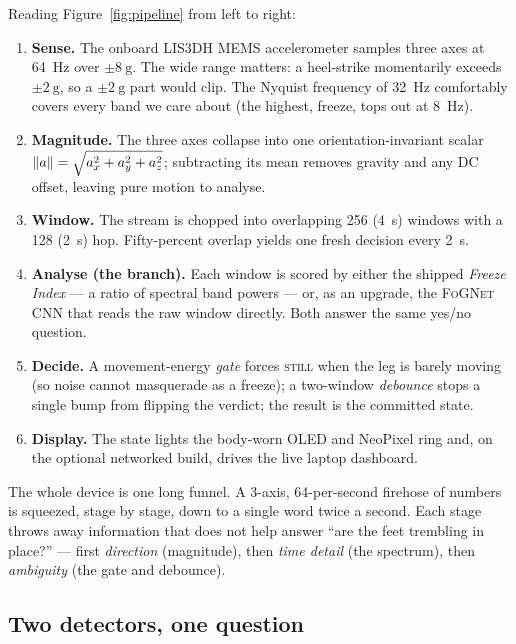 Reading Figure~\ref{fig:pipeline} from left to right:

\begin{enumerate}
  \item \textbf{Sense.} The onboard LIS3DH MEMS accelerometer samples three axes at
    \SI{64}{\hertz} over $\pm\SI{8}{\gram}$. The wide range matters: a heel-strike
    momentarily exceeds $\pm\SI{2}{\gram}$, so a $\pm\SI{2}{\gram}$ part would clip.
    The Nyquist frequency of \SI{32}{\hertz} comfortably covers every band we care about
    (the highest, freeze, tops out at \SI{8}{\hertz}).
  \item \textbf{Magnitude.} The three axes collapse into one orientation-invariant
    scalar $\lVert a \rVert=\sqrt{a_x^2+a_y^2+a_z^2}$; subtracting its mean removes gravity and
    any DC offset, leaving pure motion to analyse.
  \item \textbf{Window.} The stream is chopped into overlapping
    \SI{256}{} (\SI{4}{\second}) windows with a \SI{128}{}
    (\SI{2}{\second}) hop. Fifty-percent overlap yields one fresh decision every
    \SI{2}{\second}.
  \item \textbf{Analyse (the branch).} Each window is scored by either the shipped
    \emph{Freeze Index} --- a ratio of spectral band powers --- or, as an upgrade, the
    \textsc{FoGNet} CNN that reads the raw window directly. Both answer the same yes/no
    question.
  \item \textbf{Decide.} A movement-energy \emph{gate} forces \textsc{still} when the leg
    is barely moving (so noise cannot masquerade as a freeze); a two-window
    \emph{debounce} stops a single bump from flipping the verdict; the result is the
    committed state.
  \item \textbf{Display.} The state lights the body-worn OLED and NeoPixel ring and, on
    the optional networked build, drives the live laptop dashboard.
\end{enumerate}

\begin{intuition}
The whole device is one long funnel. A 3-axis, 64-per-second firehose of numbers is
squeezed, stage by stage, down to a single word twice a second. Each stage throws away
information that does not help answer ``are the feet trembling in place?'' --- first
\emph{direction} (magnitude), then \emph{time detail} (the spectrum), then \emph{ambiguity}
(the gate and debounce).
\end{intuition}

\subsection{Two detectors, one question}

